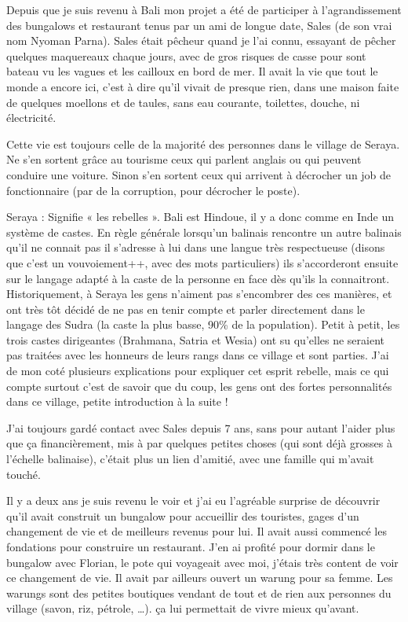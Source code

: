Depuis que je suis revenu à Bali mon projet a été de participer à l’agrandissement des bungalows et restaurant tenus par un ami de longue date, Sales (de son vrai nom Nyoman Parna). Sales était pêcheur quand je l’ai connu, essayant de pêcher quelques maquereaux chaque jours, avec de gros risques de casse pour sont bateau vu les vagues et les cailloux en bord de mer. Il avait la vie que tout le monde a encore ici, c’est à dire qu’il vivait de presque rien, dans une maison faite de quelques moellons et de taules, sans eau courante, toilettes, douche, ni électricité.

Cette vie est toujours celle de la majorité des personnes dans le village de Seraya. Ne s’en sortent grâce au tourisme ceux qui parlent anglais ou qui peuvent conduire une voiture. Sinon s’en sortent ceux qui arrivent à décrocher un job de fonctionnaire (par de la corruption, pour décrocher le poste).

Seraya : Signifie « les rebelles ». Bali est Hindoue, il y a donc comme en Inde un système de castes. En règle générale lorsqu’un balinais rencontre un autre balinais qu’il ne connait pas il s’adresse à lui dans une langue très respectueuse (disons que c’est un vouvoiement++, avec des mots particuliers) ils s’accorderont ensuite sur le langage adapté à la caste de la personne en face dès qu’ils la connaitront. Historiquement, à Seraya les gens n’aiment pas s’encombrer des ces manières, et ont très tôt décidé de ne pas en tenir compte et parler directement dans le langage des Sudra (la caste la plus basse, 90\% de la population). Petit à petit, les trois castes dirigeantes (Brahmana, Satria et Wesia) ont su qu’elles ne seraient pas traitées avec les honneurs de leurs rangs dans ce village et sont parties. J’ai de mon coté plusieurs explications pour expliquer cet esprit rebelle, mais ce qui compte surtout c’est de savoir que du coup, les gens ont des fortes personnalités dans ce village, petite introduction à la suite !

J’ai toujours gardé contact avec Sales depuis 7 ans, sans pour autant l’aider plus que ça financièrement, mis à par quelques petites choses (qui sont déjà grosses à l’échelle balinaise), c’était plus un lien d’amitié, avec une famille qui m’avait touché.

Il y a deux ans je suis revenu le voir et j’ai eu l’agréable surprise de découvrir qu’il avait construit un bungalow pour accueillir des touristes, gages d’un changement de vie et de meilleurs revenus pour lui. Il avait aussi commencé les fondations pour construire un restaurant. J’en ai profité pour dormir dans le bungalow avec Florian, le pote qui voyageait avec moi, j’étais très content de voir ce changement de vie. Il avait par ailleurs ouvert un warung pour sa femme. Les warungs sont des petites boutiques vendant de tout et de rien aux personnes du village (savon, riz, pétrole, …). ça lui permettait de vivre mieux qu’avant.

